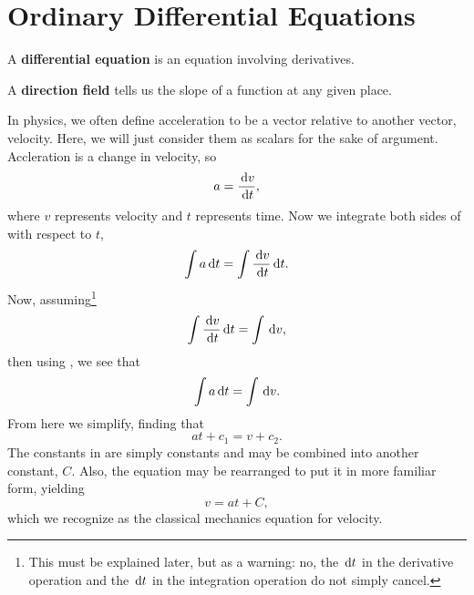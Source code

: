\chapter{Ordinary Differential Equations}
\begin{defn}
  A \textbf{differential equation} is an equation involving derivatives.
\end{defn}
\begin{defn}
  A \textbf{direction field} tells us the slope of a function at any given place.
\end{defn}
\begin{ex}
    In physics, we often define acceleration to be a vector relative to another vector, velocity.
    Here, we will just consider them as scalars for the sake of argument.
    Accleration is a change in velocity, so
    \begin{equation}
        a = \frac{\,\mathrm{d} v}{\,\mathrm{d} t},
        \label{eq:acceleration}
    \end{equation}
    where $v$ represents velocity and $t$ represents time.
    Now we integrate both sides of  with respect to $t$,
    \begin{equation}
        \int a \,\mathrm{d} t = \int \frac{\,\mathrm{d} v}{\,\mathrm{d} t} \,\mathrm{d} t.
        \label{eq:intaccel}
    \end{equation}
    Now, assuming\footnote{This must be explained later, but as a warning: no, the $\,\mathrm{d} t$ in the derivative operation and the $\,\mathrm{d} t$ in the integration operation do not simply cancel.}
    \begin{equation}
        \int \frac{\,\mathrm{d} v}{\,\mathrm{d} t} \,\mathrm{d} t = \int \,\mathrm{d} v,
        \label{eq:handwave}
    \end{equation}
    then using , we see that
    \begin{equation}
        \int a \,\mathrm{d} t = \int \,\mathrm{d} v.
        \label{eq:naughtint}
    \end{equation}
    From here we simplify, finding that
    \begin{equation}
        at + c_1 = v + c_2.
        \label{eq:almostvelocity}
    \end{equation}
    The constants in  are simply constants and may be combined into another constant, $C$.
    Also, the equation may be rearranged to put it in more familiar form, yielding
    \begin{equation}
        v = at + C,
        \label{eq:velocity}
    \end{equation}
    which we recognize as the classical mechanics equation for velocity.

\end{ex}
